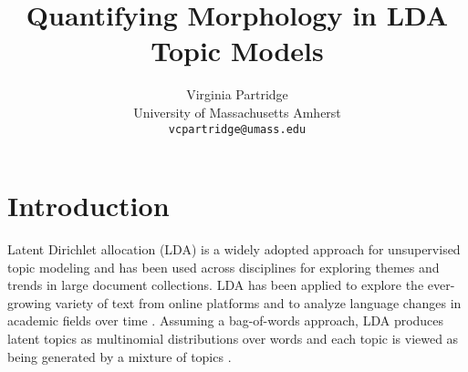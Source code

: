 \documentclass[11pt,a4paper]{article}
\title{Quantifying Morphology in LDA Topic Models}
\author{Virginia Partridge \\
  University of Massachusetts Amherst\\
  \texttt{vcpartridge@umass.edu}
}
\date{}
\begin{document}
\maketitle


\section{Introduction}
Latent Dirichlet allocation (LDA) is a widely adopted approach for unsupervised topic modeling and has been used across disciplines for exploring themes and trends in large document collections. LDA has been applied to explore the ever-growing variety of text from online platforms and to analyze language changes in academic fields over time \cite{koltsova2013,mcfarland2013differentiating, vogel-jurafsky-2012-said, mitrofanova2015probabilistic}. Assuming a bag-of-words approach, LDA produces latent topics as multinomial distributions over words and each topic is viewed as being generated by a mixture of topics \cite{blei2003,steyvers2007probabilistic}.
\end{document}
